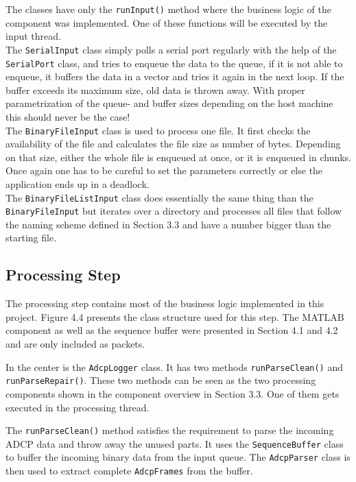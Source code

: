 The classes have only the \texttt{runInput()} method where the business logic of the component was implemented. One of these functions will be executed by the input thread. \\ 
The \texttt{SerialInput} class simply polls a serial port regularly with the help of the \texttt{SerialPort} class, and tries to enqueue the data to the queue, if it is not able to enqueue, it buffers the data in a vector and tries it again in the next loop. If the buffer exceeds its maximum size, old data is thrown away. With proper parametrization of the queue- and buffer sizes depending on the host machine this should never be the case!\\
The \texttt{BinaryFileInput} class is used to process one file. It first checks the availability of the file and calculates the file size as number of bytes. Depending on that size, either the whole file is enqueued at once, or it is enqueued in chunks. Once again one has to be careful to set the parameters correctly or else the application ends up  in a deadlock.\\
The \texttt{BinaryFileListInput} class does essentially the same thing than the \texttt{BinaryFileInput} but iterates over a directory and processes all files that follow the naming scheme defined in Section 3.3 and have a number bigger than the starting file.
\subsection{Processing Step}
The processing step contains most of the business logic implemented in this project. Figure 4.4 presents the class structure used for this step. The MATLAB component as well as the sequence buffer were presented in Section 4.1 and 4.2 and are only included as packets.

In the center is the \texttt{AdcpLogger} class. It has two methods \texttt{runParseClean()} and \texttt{runParseRepair()}. These two methods can be seen as the two processing components shown in the component overview in Section 3.3. One of them gets executed in the processing thread.

The \texttt{runParseClean()} method satisfies the requirement to parse the incoming ADCP data and throw away the unused parts. It uses the \texttt{SequenceBuffer} class to buffer the incoming binary data from the input queue. The \texttt{AdcpParser} class is then used to extract complete \texttt{AdcpFrames} from the buffer.

